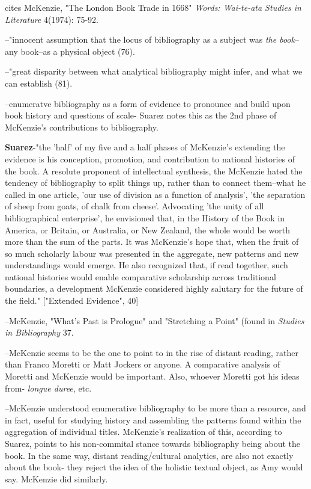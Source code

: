 \documentclass[course, english]{Notes}
\newcommand{\n}{\scalebox{2}{\textbf{\framebox{$\aleph$}}}}
\begin{document}
cites McKenzie, "The London Book Trade in 1668" \emph{Words: Wai-te-ata Studies in Literature} 4(1974): 75-92.
	\begin{displayquote}
	--"innocent assumption that the locus of bibliography as a subject was \emph{the book}--any book--as a physical object (76). 
	
	--"great disparity between what analytical bibliography might infer, and what we can establish (81). 
	\end{displayquote}

\n --enumeratve bibliography as a form of evidence to pronounce and build upon book history and questions of scale- Suarez notes this as the 2nd phase of McKenzie's contributions to bibliography.

\textbf{Suarez}-"the 'half' of my five and a half phases of McKenzie's extending the evidence is his conception, promotion, and contribution to national histories of the book. A resolute proponent of intellectual synthesis, the McKenzie hated the tendency of bibliography to split things up, rather than to connect them--what he called in one article, 'our use of division as a function of analysis', 'the separation of sheep from goats, of chalk from cheese'. Advocating 'the unity of all bibliographical  enterprise', he envisioned that, in the History of the Book in America, or Britain, or Australia, or New Zealand, the whole would be worth more than the sum of the parts. It was McKenzie's hope that, when the fruit of so much scholarly labour was presented in the aggregate, new patterns and new understandings would emerge. He also recognized that, if read together, such national histories would enable comparative scholarship across traditional boundaries, a development McKenzie considered highly salutary for the future of the field." ["Extended Evidence", 40]
	\begin{displayquote}
	--McKenzie, "What's Past is Prologue" and "Stretching a Point" (found in \emph{Studies in Bibliography} 37.
	\end{displayquote}
	
\n --McKenzie seems to be the one to point to in the rise of distant reading, rather than Franco Moretti or Matt Jockers or anyone. A comparative analysis of Moretti and McKenzie would be important. Also, whoever Moretti got his ideas from- \emph{longue duree}, etc. 

\n --McKenzie understood enumerative bibliography to be more than a resource, and in fact, useful for studying history and assembling the patterns found within the aggregation of individual titles. McKenzie's realization of this, according to Suarez, points to his non-commital stance towards bibliography being about the book. In the same way, distant reading/cultural analytics, are also not exactly about the book- they reject the idea of the holistic textual object, as Amy would say. McKenzie did similarly.
\end{document}
